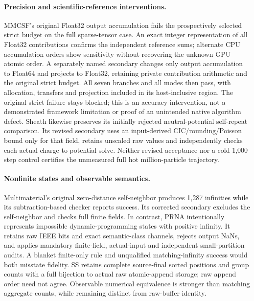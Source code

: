 \paragraph{Precision and scientific-reference interventions.}
MMCSF's original Float32 output accumulation fails the prospectively selected strict budget on the full sparse-tensor case. An exact integer representation of all Float32 contributions confirms the independent reference sums; alternate CPU accumulation orders show sensitivity without recovering the unknown GPU atomic order. A separately named secondary changes only output accumulation to Float64 and projects to Float32, retaining private contribution arithmetic and the original strict budget. All seven branches and all modes then pass, with allocation, transfers and projection included in its host-inclusive region. The original strict failure stays blocked; this is an accuracy intervention, not a demonstrated framework limitation or proof of an unintended native algorithm defect. Sheath likewise preserves its initially rejected neutral-potential self-repeat comparison. Its revised secondary uses an input-derived CIC/rounding/Poisson bound only for that field, retains unscaled raw values and independently checks each actual charge-to-potential solve. Neither revised acceptance nor a cold 1,000-step control certifies the unmeasured full hot million-particle trajectory.

\paragraph{Nonfinite states and observable semantics.}
Multimaterial's original zero-distance self-neighbor produces 1,287 infinities while its subtraction-based checker reports success. Its corrected secondary excludes the self-neighbor and checks full finite fields. In contrast, PRNA intentionally represents impossible dynamic-programming states with positive infinity. It retains raw IEEE bits and exact semantic-class channels, rejects output NaNs, and applies mandatory finite-field, actual-input and independent small-partition audits. A blanket finite-only rule and unqualified matching-infinity success would both misstate fidelity. SS retains complete source-final sorted positions and group counts with a full bijection to actual raw atomic-append storage; raw append order need not agree. Observable numerical equivalence is stronger than matching aggregate counts, while remaining distinct from raw-buffer identity.

